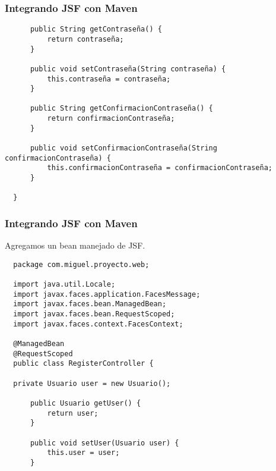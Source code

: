 \documentclass{beamer}
\begin{document}
\begin{frame}[fragile]
  \frametitle{Integrando JSF con Maven}
  \begin{verbatim}
      public String getContraseña() {
          return contraseña;
      }

      public void setContraseña(String contraseña) {
          this.contraseña = contraseña;
      }

      public String getConfirmacionContraseña() {
          return confirmacionContraseña;
      }

      public void setConfirmacionContraseña(String confirmacionContraseña) {
          this.confirmacionContraseña = confirmacionContraseña;
      }

  }
  \end{verbatim}
\end{frame}

\begin{frame}[fragile]
  \frametitle{Integrando JSF con Maven}

  Agregamos un bean manejado de JSF.

  \begin{verbatim}
  package com.miguel.proyecto.web;

  import java.util.Locale;
  import javax.faces.application.FacesMessage;
  import javax.faces.bean.ManagedBean;
  import javax.faces.bean.RequestScoped;
  import javax.faces.context.FacesContext;

  @ManagedBean
  @RequestScoped
  public class RegisterController {

  private Usuario user = new Usuario();

      public Usuario getUser() {
          return user;
      }

      public void setUser(Usuario user) {
          this.user = user;
      }

  \end{verbatim}
\end{frame}
\end{document}
